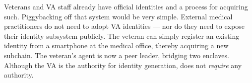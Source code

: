 Veterans and VA staff already have official identities and a process for acquiring such.
Piggybacking off that system would be very simple.
External medical practitioners do not need to adopt VA identities --- nor do they need to expose their identity subsystem publicly.
The veteran can simply register an existing identity from a smartphone at the medical office, thereby acquiring a new subchain.
The veteran's agent is now a peer leader, bridging two enclaves.
Although the VA is the authority for identity generation, \projectName does not \emph{require} any authority.
